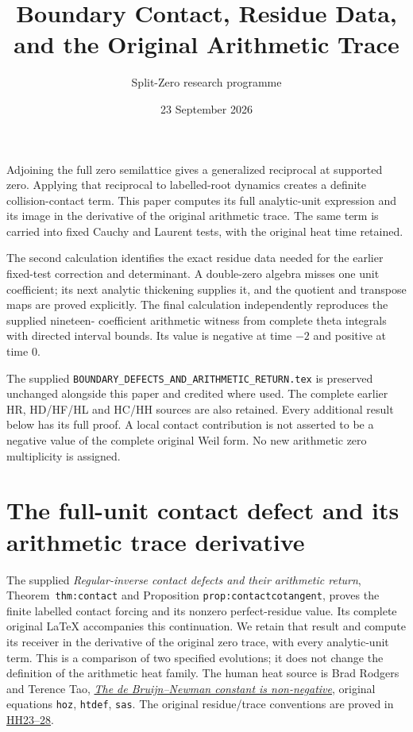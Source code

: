 \documentclass[11pt,a4paper]{article}
\title{Boundary Contact, Residue Data, and the Original Arithmetic Trace}
\author{Split-Zero research programme}
\date{23 September 2026}
\theoremstyle{definition}\newtheorem{definition}[theorem]{Definition}
\begin{document}
\maketitle
Adjoining the full zero semilattice gives a generalized reciprocal at
supported zero. Applying that reciprocal to labelled-root dynamics
creates a definite collision-contact term. This paper computes its
full analytic-unit expression and its image in the derivative of the
original arithmetic trace. The same term is carried into fixed Cauchy
and Laurent tests, with the original heat time retained.

The second calculation identifies the exact residue data needed for
the earlier fixed-test correction and determinant. A double-zero
algebra misses one unit coefficient; its next analytic thickening
supplies it, and the quotient and transpose maps are proved explicitly.
The final calculation independently reproduces the supplied nineteen-
coefficient arithmetic witness from complete theta integrals with
directed interval bounds. Its value is negative at time $-2$ and
positive at time $0$.

The supplied \texttt{BOUNDARY\_DEFECTS\_AND\_ARITHMETIC\_RETURN.tex}
is preserved unchanged alongside this paper and credited where used.
The complete earlier HR, HD/HF/HL and HC/HH sources are also retained.
Every additional result below has its full proof. A local contact
contribution is not asserted to be a negative value of the complete
original Weil form. No new arithmetic zero multiplicity is assigned.
\tableofcontents
\clearpage
\section{The full-unit contact defect and its arithmetic trace derivative}
\label{sec:contact-trace-variation}

The supplied \emph{Regular-inverse contact defects and their arithmetic
return}, Theorem~\texttt{thm:contact} and Proposition
\texttt{prop:contactcotangent}, proves the finite labelled contact
forcing and its nonzero perfect-residue value. Its complete original
LaTeX accompanies this continuation. We retain that result and compute
its receiver in the derivative of the original zero trace, with every
analytic-unit term. This is a comparison of two specified evolutions;
it does not change the definition of the arithmetic heat family.
The human heat source is Brad Rodgers and Terence Tao,
\href{https://arxiv.org/abs/1801.05914v5}{\emph{The de Bruijn--Newman
constant is non-negative}}, original equations \texttt{hoz},
\texttt{htdef}, \texttt{sas}. The original residue/trace conventions
are proved in
\href{https://github.com/KokunoYumeto/zeta-function-research-reader/blob/3c022a0adde0a6aa3d8fc8e43ef42795d88e44b0/workbenches/splitzero-tandem/continuations/20260923-supported-zero-collision-holonomy/HEAT_COLLISION_HOLONOMY.tex}{HH23--28}.
\end{document}
